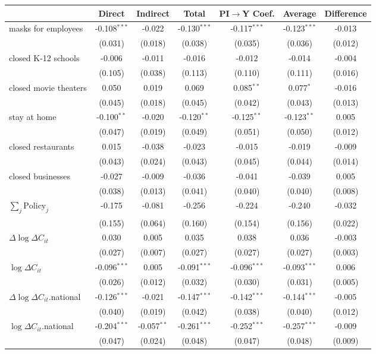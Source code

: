 
\begin{tabular}{lccccc|>{}c}
\toprule
  & Direct & Indirect & Total & PI$\to$Y Coef. & Average & Difference\\
\midrule
masks for employees & -0.108$^{***}$ & -0.022 & -0.130$^{***}$ & -0.117$^{***}$ & -0.123$^{***}$ & -0.013\\
 & (0.031) & (0.018) & (0.038) & (0.035) & (0.036) & (0.012)\\
closed K-12 schools & -0.006 & -0.011 & -0.016 & -0.012 & -0.014 & -0.004\\
 & (0.105) & (0.038) & (0.113) & (0.110) & (0.111) & (0.016)\\
closed movie theaters & 0.050 & 0.019 & 0.069 & 0.085$^{**}$ & 0.077$^{*}$ & -0.016\\
 & (0.045) & (0.018) & (0.045) & (0.042) & (0.043) & (0.013)\\
stay at home & -0.100$^{**}$ & -0.020 & -0.120$^{**}$ & -0.125$^{**}$ & -0.123$^{**}$ & 0.005\\
 & (0.047) & (0.019) & (0.049) & (0.051) & (0.050) & (0.012)\\
closed restaurants & 0.015 & -0.038 & -0.023 & -0.015 & -0.019 & -0.009\\
 & (0.043) & (0.024) & (0.043) & (0.045) & (0.044) & (0.014)\\
closed businesses & -0.027 & -0.009 & -0.036 & -0.041 & -0.039 & 0.005\\
 & (0.038) & (0.013) & (0.041) & (0.040) & (0.040) & (0.008)\\
$\sum_j \mathrm{Policy}_j$ & -0.175 & -0.081 & -0.256 & -0.224 & -0.240 & -0.032\\
 & (0.155) & (0.064) & (0.160) & (0.154) & (0.156) & (0.022)\\
$\Delta \log \Delta C_{it}$ & 0.030 & 0.005 & 0.035 & 0.038 & 0.036 & -0.003\\
 & (0.027) & (0.007) & (0.027) & (0.027) & (0.027) & (0.003)\\
$\log \Delta C_{it}$ & -0.096$^{***}$ & 0.005 & -0.091$^{***}$ & -0.096$^{***}$ & -0.093$^{***}$ & 0.006\\
 & (0.026) & (0.012) & (0.032) & (0.030) & (0.031) & (0.005)\\
$\Delta \log \Delta C_{it}$.national & -0.126$^{***}$ & -0.021 & -0.147$^{***}$ & -0.142$^{***}$ & -0.144$^{***}$ & -0.005\\
 & (0.040) & (0.019) & (0.042) & (0.038) & (0.040) & (0.012)\\
$\log \Delta C_{it}$.national & -0.204$^{***}$ & -0.057$^{**}$ & -0.261$^{***}$ & -0.252$^{***}$ & -0.257$^{***}$ & -0.009\\
 & (0.047) & (0.024) & (0.048) & (0.047) & (0.048) & (0.009)\\
\bottomrule
\end{tabular}